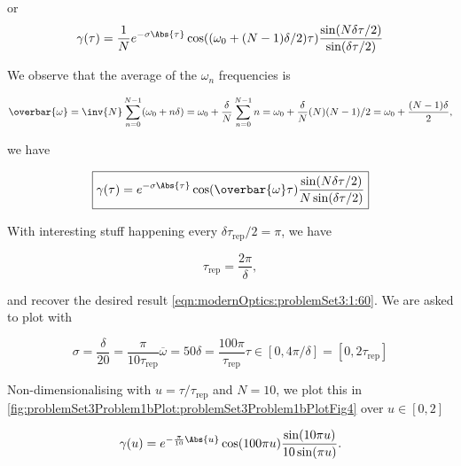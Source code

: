{or
\begin{dmath}\label{eqn:modernOptics:problemSet3:1:560}
\gamma(\tau) 
=
\frac{1}{N} e^{-\sigma \Abs{\tau} } 
\cos( ( \omega_0 + (N-1)\delta/2 ) \tau )
\frac{
\sin( N \delta \tau /2 )
}
{
\sin( \delta \tau /2 )
}
\end{dmath}

We observe that the average of the $\omega_n$ frequencies is

\begin{dmath}\label{eqn:modernOptics:problemSet3:1:580}
\overbar{\omega} 
= \inv{N} \sum_{n= 0}^{N-1} (\omega_0 + n \delta)
= \omega_0 + \frac{\delta }{N} 
\sum_{n= 0}^{N-1} n 
= \omega_0 + \frac{\delta }{N} (N)(N-1)/2
= \omega_0 + \frac{(N-1)\delta }{2},
\end{dmath}

we have

\begin{dmath}\label{eqn:modernOptics:problemSet3:1:600}
\boxed{
\gamma(\tau) 
=
e^{-\sigma \Abs{\tau} } 
\cos( \overbar{\omega} \tau )
\frac{
\sin( N \delta \tau /2 )
}
{
N \sin( \delta \tau /2 )
}
}
\end{dmath}

With interesting stuff happening every $\delta \tau_{\mathrm{rep}}/2 = \pi$, we have

\begin{dmath}\label{eqn:modernOptics:problemSet3:1:620}
\tau_{\mathrm{rep}} = \frac{2 \pi}{\delta},
\end{dmath}

and recover the desired result \ref{eqn:modernOptics:problemSet3:1:60}.  We are asked to plot with

\begin{subequations}
\begin{equation}\label{eqn:modernOptics:problemSet3:1:640}
\sigma = \frac{\delta}{20} = \frac{\pi}{10 \tau_{\mathrm{rep}}}
\end{equation}
\begin{equation}\label{eqn:modernOptics:problemSet3:1:660}
\overbar{\omega} = 50 \delta = \frac{100 \pi}{\tau_{\mathrm{rep}}}
\end{equation}
\begin{equation}\label{eqn:modernOptics:problemSet3:1:680}
\tau \in [0, 4 \pi/\delta] = [0, 2 \tau_{\mathrm{rep}}]
\end{equation}
\end{subequations}

Non-dimensionalising with $u = \tau/\tau_{\mathrm{rep}}$ and $N = 10$, we plot this in \cref{fig:problemSet3Problem1bPlot:problemSet3Problem1bPlotFig4} over $u \in [0, 2]$

\begin{dmath}\label{eqn:modernOptics:problemSet3:1:700}
\gamma(u) 
=
e^{ -\frac{\pi}{10} \Abs{u} }
\cos( 100 \pi u )
\frac{
\sin( 10 \pi u )
}
{
10 \sin( \pi u )
}.
\end{dmath}

}
